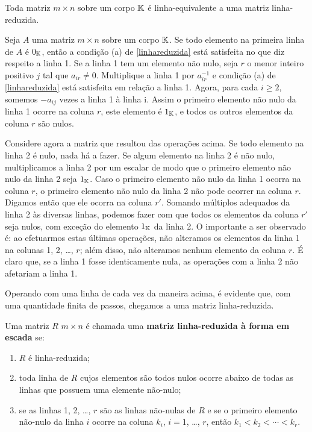 \begin{teorema}
	Toda matriz $m \times n$ sobre um corpo $\mathbb{K}$ \'e linha-equivalente a uma matriz linha-reduzida.
\end{teorema}
\begin{prova}
	Seja $A$ uma matriz $m \times n$ sobre um corpo $\mathbb{K}$. Se todo elemento na primeira linha de $A$ \'e $0_{\mathbb{K}}$, ent\~ao a condi\c{c}\~ao (a) de \eqref{linhareduzida} est\'a satisfeita no que diz respeito a linha 1. Se a linha 1 tem um elemento n\~ao nulo, seja $r$ o menor inteiro positivo $j$ tal que $a_{ir} \ne 0$. Multiplique a linha 1 por $a_{ir}^{-1}$ e condi\c{c}\~ao (a) de \eqref{linhareduzida} est\'a satisfeita em rela\c{c}\~ao a linha 1. Agora, para cada $i \ge 2$, somemos $-a_{ij}$ vezes a linha 1 \`a linha i. Assim o primeiro elemento n\~ao nulo da linha 1 ocorre na coluna $r$, este elemento \'e $1_{\mathbb{K}}$, e todos os outros elementos da coluna $r$ s\~ao nulos.

	Considere agora a matriz que resultou das opera\c{c}\~oes acima. Se todo elemento na linha 2 \'e nulo, nada h\'a a fazer. Se algum elemento na linha 2 \'e n\~ao nulo, multiplicamos a linha 2 por um escalar de modo que o primeiro elemento n\~ao nulo da linha 2 seja $1_{\mathbb{K}}$. Caso o primeiro elemento n\~ao nulo da linha 1 ocorra na coluna $r$, o primeiro elemento n\~ao nulo da linha 2 n\~ao pode ocorrer na coluna $r$. Digamos ent\~ao que ele ocorra na coluna $r'$. Somando m\'ultiplos adequados da linha 2 \`as diversas linhas, podemos fazer com que todos os elementos da coluna $r'$ seja nulos, com exce\c{c}\~ao do elemento $1_{\mathbb{K}}$ da linha 2. O importante a ser observado \'e: ao efetuarmos estas \'ultimas opera\c{c}\~oes, n\~ao alteramos os elementos da linha 1 na colunas 1, 2, \dots, $r$; al\'em disso, n\~ao alteramos nenhum elemento da coluna $r$. \'E claro que, se a linha 1 fosse identicamente nula, as opera\c{c}\~oes com a linha 2 n\~ao afetariam a linha 1.

	Operando com uma linha de cada vez da maneira acima, \'e evidente que, com uma quantidade finita de passos, chegamos a uma matriz linha-reduzida.
\end{prova}

\begin{definicao}
	Uma matriz $R$ $m \times n$ \'e chamada uma \textbf{matriz linha-reduzida \`a forma em escada} se:
	\begin{enumerate}
		\item $R$ \'e linha-reduzida;
		\item toda linha de $R$ cujos elementos s\~ao todos nulos ocorre abaixo de todas as linhas que possuem uma elemente n\~ao-nulo;
		\item se as linhas 1, 2, \dots, $r$ s\~ao as linhas n\~ao-nulas de $R$ e se o primeiro elemento n\~ao-nulo da linha $i$ ocorre na coluna $k_i$, $i = 1$, \dots, $r$, ent\~ao $k_1 < k_2 < \cdots < k_r$.
	\end{enumerate}
\end{definicao}

